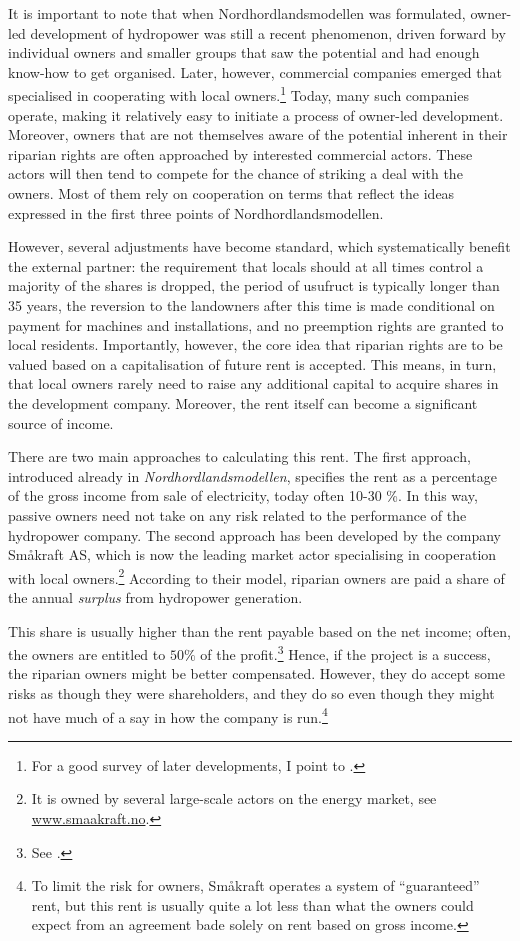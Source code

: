 It is important to note that when Nordhordlandsmodellen was formulated, owner-led development of hydropower was still a recent phenomenon, driven forward by individual owners and smaller groups that saw the potential and had enough know-how to get organised. Later, however, commercial companies emerged that specialised in cooperating with local owners.\footnote{For a good survey of later developments, I point to \cite{larsen06,larsen08,larsen12}.} Today, many such companies operate, making it relatively easy to initiate a process of owner-led development. Moreover, owners that are not themselves aware of the potential inherent in their riparian rights are often approached by interested commercial actors. These actors will then tend to compete for the chance of striking a deal with the owners. Most of them rely on cooperation on terms that reflect the ideas expressed in the first three points of Nordhordlandsmodellen.

However, several adjustments have become standard, which systematically benefit the external partner: the requirement that locals should at all times control a majority of the shares is dropped, the period of usufruct is typically longer than 35 years, the reversion to the landowners after this time is made conditional on payment for machines and installations, and no preemption rights are granted to local residents. Importantly, however, the core idea that riparian rights are to be valued based on a capitalisation of future rent is accepted. This means, in turn, that local owners rarely need to raise any additional capital to acquire shares in the development company. Moreover, the rent itself can become a significant source of income.

There are two main approaches to calculating this rent. The first approach, introduced already in {\it Nordhordlandsmodellen}, specifies the rent as a percentage of the gross income from sale of electricity, today often 10-30 \%. In this way, passive owners need not take on any risk related to the performance of the hydropower company. The second approach has been developed by the company Småkraft AS, which is now the leading market actor specialising in cooperation with local owners.\footnote{It is owned by several large-scale actors on the energy market, see \url{www.smaakraft.no}.} According to their model, riparian owners are paid a share of the annual {\it surplus} from hydropower generation.

This share is usually higher than the rent payable based on the net income; often, the owners are entitled to $50 \%$ of the profit.\footnote{See \cite{aanesland09}.} Hence, if the project is a success, the riparian owners might be better compensated. However, they do accept some risks as though they were shareholders, and they do so even though they might not have much of a say in how the company is run.\footnote{To limit the risk for owners, Småkraft operates a system of ``guaranteed'' rent, but this rent is usually quite a lot less than what the owners could expect from an agreement bade solely on rent based on gross income.}

